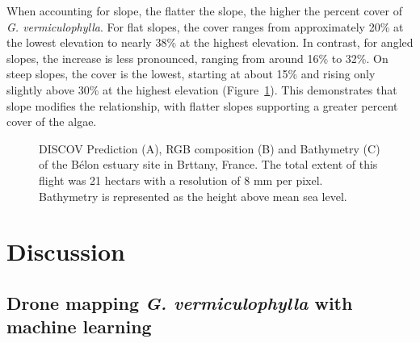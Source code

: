 \documentclass[
  letterpaper,
  DIV=11,
  numbers=noendperiod]{scrartcl}
\begin{document}
When accounting for slope, the flatter the slope, the higher the percent
cover of \emph{G. vermiculophylla}. For flat slopes, the cover ranges
from approximately 20\% at the lowest elevation to nearly 38\% at the
highest elevation. In contrast, for angled slopes, the increase is less
pronounced, ranging from around 16\% to 32\%. On steep slopes, the cover
is the lowest, starting at about 15\% and rising only slightly above
30\% at the highest elevation (Figure~\ref{fig-Gam_Slope}). This
demonstrates that slope modifies the relationship, with flatter slopes
supporting a greater percent cover of the algae.

\label{cell-fig-Gam_Slope}
\begin{figure}[H]


\caption{\label{fig-Gam_Slope}DISCOV Prediction (A), RGB composition (B)
and Bathymetry (C) of the Bélon estuary site in Brttany, France. The
total extent of this flight was 21 hectars with a resolution of 8 mm per
pixel. Bathymetry is represented as the height above mean sea level.}

\end{figure}%

\section{Discussion}\label{discussion}

\subsection{\texorpdfstring{Drone mapping \emph{G. vermiculophylla} with
machine
learning}{Drone mapping G. vermiculophylla with machine learning}}\label{drone-mapping-g.-vermiculophylla-with-machine-learning}
\end{document}

